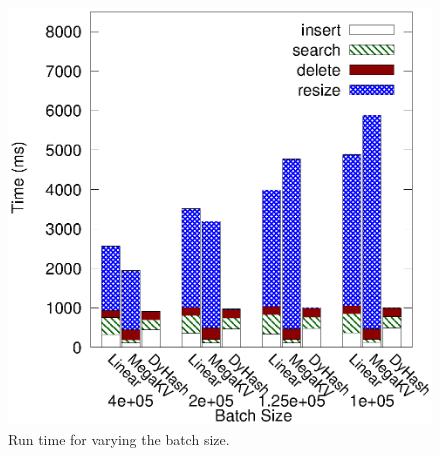\begin{figure}[h]
\begin{minipage}{0.18\linewidth}
		\centerline{\dsali}
	\end{minipage}
	\hfill
	\begin{minipage}{0.18\linewidth}\centering
		\includegraphics[width=\linewidth]{pic/dynamic/random/diff_batch_size.eps}
		\centerline{\dsrandom}
	\end{minipage}
	\caption{Run time for varying the batch size.}
	\label{fig:vary-batch-size}
\end{figure}
